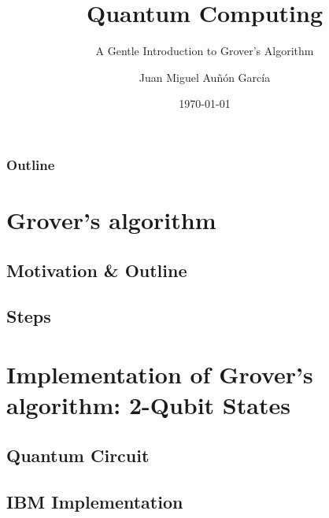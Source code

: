 \documentclass[aspectratio=169]{beamer}
\title[Quantum Computing: Shor's]{Quantum Computing}
\subtitle{A Gentle Introduction to Grover's Algorithm}
\date{\today}
\author[jmaunon]{Juan Miguel Au\~n\'on Garc\'ia}
\begin{document}
\begin{frame}
\titlepage
\end{frame}


\begin{frame}[plain]
\frametitle{Outline}
\tableofcontents

\end{frame}


%


\section{Grover's algorithm}


\subsection{Motivation \& Outline}



\subsection{Steps}





\section{Implementation of Grover's algorithm: 2-Qubit States}
\subsection{Quantum Circuit}

\subsection{IBM Implementation}

\end{document}
